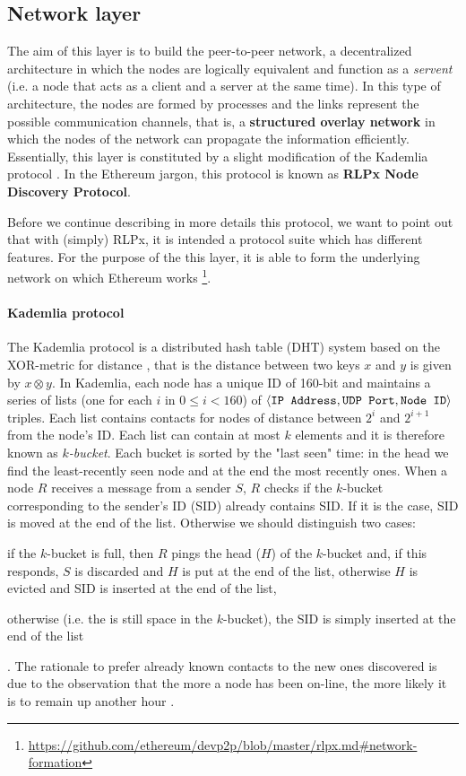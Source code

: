 \subsection{Network layer}
\label{sec:network-layer}

The aim of this layer is to build the peer-to-peer network, a decentralized
architecture in which the nodes are logically equivalent and function as a
\emph{servent} (i.e. a node that acts as a client and a server at the same
time). In this type of architecture, the nodes are formed by processes and the
links represent the possible communication channels, that is, a
\textbf{structured overlay network} \cite{van2017distributed} in which the nodes
of the network can propagate the information efficiently. Essentially, this
layer is constituted by a slight modification of the Kademlia protocol
\cite{bib:kademlia}. In the Ethereum jargon, this protocol is known as
\textbf{RLPx Node Discovery Protocol}.

Before we continue describing in more details this protocol, we want to point
out that with (simply) RLPx, it is intended a protocol suite which has different
features. For the purpose of the this layer, it is able to form the underlying
network on which Ethereum works
\footnote{\url{https://github.com/ethereum/devp2p/blob/master/rlpx.md\#network-formation}}.

\paragraph{Kademlia protocol}
The Kademlia protocol is a distributed hash table (DHT) system based on the
XOR-metric for distance \cite{bib:kademlia}, that is the distance between two
keys $x$ and $y$ is given by $x \otimes y$. In Kademlia, each node has a unique
ID of 160-bit and maintains a series of lists (one for each $i$ in $0 \leq i <
160$) of $\langle \verb|IP Address|, \verb|UDP Port|, \verb|Node ID| \rangle$
triples. Each list contains contacts for nodes of distance between $2^i$ and
$2^{i+1}$ from the node's ID. Each list can contain at most $k$ elements and it
is therefore known as \textit{$k$-bucket}. Each bucket is sorted by the "last
seen" time: in the head we find the least-recently seen node and at the end the
most recently ones. When a node $R$ receives a message from a sender $S$, $R$
checks if the $k$-bucket corresponding to the sender's ID (SID) already contains
SID. If it is the case, SID is moved at the end of the list. Otherwise we should
distinguish two cases:
\begin{enumerate*}[label=(\arabic*)]
  \item if the $k$-bucket is full, then $R$ pings the head ($H$) of the
  $k$-bucket and, if this responds, $S$ is discarded and $H$ is put at the end
  of the list, otherwise $H$ is evicted and SID is inserted at the end of the
  list,
  \item otherwise (i.e. the is still space in the $k$-bucket), the SID is simply
  inserted at the end of the list
\end{enumerate*}.
The rationale to prefer already known contacts to the new ones discovered is due
to the observation that the more a node has been on-line, the more likely it is
to remain up another hour \cite{bib:kademlia}.


